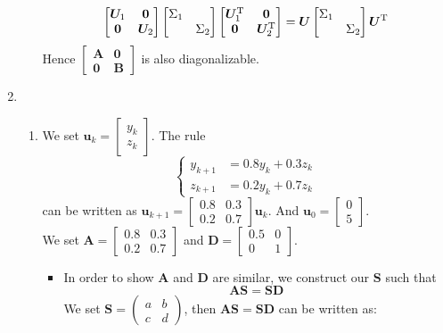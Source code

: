 \begin{enumerate}
\begin{enumerate}
\[\begin{bmatrix}
\bm U_1&\bm0\\\bm0&\bm U_2
\end{bmatrix}\begin{bmatrix}
\Sigma_1&\\&\Sigma_2
\end{bmatrix}\begin{bmatrix}
\bm U_1^{\mathrm T}&\bm0\\\bm0&\bm U_2^{\mathrm T}
\end{bmatrix}=\bm U\begin{bmatrix}
\Sigma_1&\\&\Sigma_2
\end{bmatrix}\bm U^{\mathrm T}
\]
Hence $\begin{bmatrix}
\bm A&\bm0\\\bm0&\bm B
\end{bmatrix}$ is also diagonalizable.
\end{enumerate}
\item
\begin{enumerate}
\item
We set $\bm u_k=\begin{bmatrix}
y_{k}\\z_{k}
\end{bmatrix}$. The rule
\[
\left\{
\begin{aligned}
y_{k+1}&=0.8y_k+0.3z_k\\
z_{k+1}&=0.2y_k+0.7z_k
\end{aligned}
\right.
\]
can be written as $\bm u_{k+1}=\begin{bmatrix}
0.8&0.3\\0.2&0.7
\end{bmatrix}\bm u_k$. And $\bm u_0=\begin{bmatrix}
0\\5
\end{bmatrix}.$\\
We set $\bm A=\begin{bmatrix}
0.8&0.3\\0.2&0.7
\end{bmatrix}$ and $\bm D=\begin{bmatrix}
0.5&0\\0&1
\end{bmatrix}$.
\begin{itemize}
\item
In order to show $\bm A$ and $\bm D$ are similar, we construct our $\bm S$ such that
\[
\bm{AS}=\bm{SD}
\]
We set $\bm S=\begin{pmatrix}
a&b\\c&d
\end{pmatrix}$, then $\bm{AS}=\bm{SD}$ can be written as:

\end{itemize}
\end{enumerate}
\end{enumerate}
